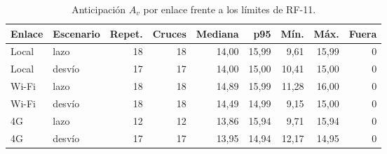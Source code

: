 \begin{table}[H]
\centering
\caption{Anticipación $A_v$ por enlace frente a los límites de RF-11.}
\label{tab:anticipacion_parada}
\small
\begin{tabular}{llrrrrrrr}
\toprule
\textbf{Enlace} & \textbf{Escenario} & \textbf{Repet.} & \textbf{Cruces} & \textbf{Mediana} & \textbf{p95} & \textbf{Mín.} & \textbf{Máx.} & \textbf{Fuera} \\
\midrule
Local & lazo & 18 & 18 & 14,00 & 15,99 & 9,61 & 15,99 & 0 \\
Local & desvío & 17 & 17 & 14,00 & 15,00 & 10,41 & 15,00 & 0 \\
Wi-Fi & lazo & 18 & 18 & 14,89 & 15,99 & 11,28 & 16,00 & 0 \\
Wi-Fi & desvío & 18 & 18 & 14,49 & 14,99 & 9,15 & 15,00 & 0 \\
4G & lazo & 12 & 12 & 13,86 & 15,94 & 9,71 & 15,94 & 0 \\
4G & desvío & 17 & 17 & 13,95 & 14,94 & 12,17 & 14,95 & 0 \\
\bottomrule
\end{tabular}
\par{}
\end{table}
